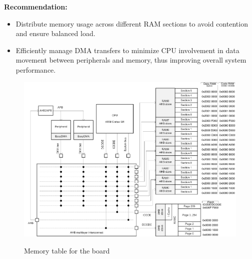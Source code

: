 \documentclass{Configuration_Files/PoliMi3i_thesis}
\begin{document}
\textbf{Recommendation:}
\begin{itemize}
    \item Distribute memory usage across different RAM sections to avoid contention and ensure balanced load.
    \item Efficiently manage DMA transfers to minimize CPU involvement in data movement between peripherals and memory, thus improving overall system performance.
\end{itemize}

\begin{figure}[H]
    \includegraphics[scale=0.3]{memNRF.png}
    \centering
    \label{mem_table_1}
    \caption{Memory table for the board \cite{NordicSemiconductorInfocenter}}
    \end{figure}
\end{document}
